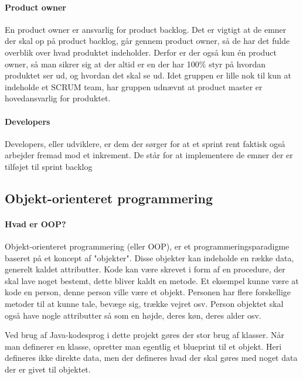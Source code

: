 \paragraph{Product owner}
En product owner er ansvarlig for product backlog. Det er vigtigt at de emner der skal op på product backlog, går gennem product owner, så de har det fulde overblik over hvad produktet indeholder. Derfor er der også kun én product owner, så man sikrer sig at der altid er en der har 100\% styr på hvordan produktet ser ud, og hvordan det skal se ud. Idet gruppen er lille nok til kun at indeholde et SCRUM team, har gruppen udnævnt at product master er hovedansvarlig for produktet. 

\paragraph{Developers}
Developers, eller udviklere, er dem der sørger for at et sprint rent faktisk også arbejder fremad mod et inkrement. De står for at implementere de emner der er tilføjet til sprint backlog

\subsection{Objekt-orienteret programmering}
\paragraph{Hvad er OOP?}
Objekt-orienteret programmering (eller OOP), er et programmeringsparadigme baseret på et koncept af "objekter". Disse objekter kan indeholde en række data, generelt kaldet attributter. Kode kan være skrevet i form af en procedure, der skal lave noget bestemt, dette bliver kaldt en metode. Et eksempel kunne være at kode en person, denne person ville være et objekt. Personen har flere forskellige metoder til at kunne tale, bevæge sig, trække vejret osv. Person objektet skal også have nogle attributter så som en højde, deres køn, deres alder osv. 

Ved brug af Java-kodesprog i dette projekt gøres der stor brug af klasser. Når man definerer en klasse, opretter man egentlig et blueprint til et objekt. Heri defineres ikke direkte data, men der defineres hvad der skal gøres med noget data der er givet til objektet.

